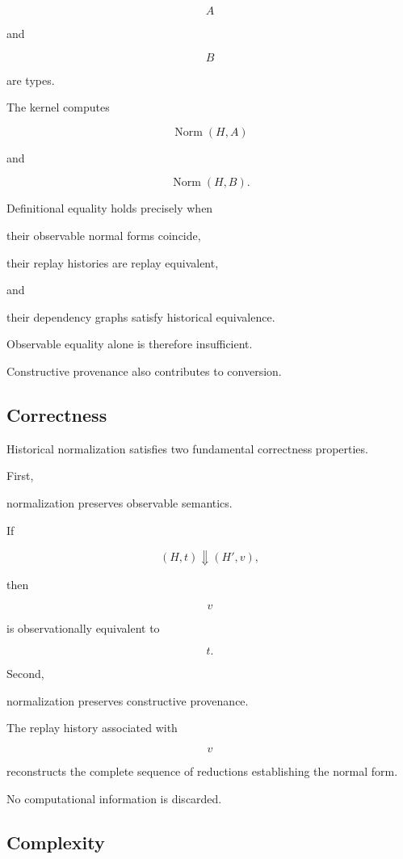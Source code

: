 \documentclass[12pt,oneside]{article}
\theoremstyle{definition}
\theoremstyle{remark}
\begin{document}
\[
A
\]

and

\[
B
\]

are types.

The kernel computes

\[
\operatorname{Norm}(H,A)
\]

and

\[
\operatorname{Norm}(H,B).
\]

Definitional equality holds precisely when

their observable normal forms coincide,

their replay histories are replay equivalent,

and

their dependency graphs satisfy historical equivalence.

Observable equality alone is therefore insufficient.

Constructive provenance also contributes to conversion.


\subsection{Correctness}

Historical normalization satisfies two fundamental correctness properties.

First,

normalization preserves observable semantics.

If

\[
(H,t)
\Downarrow
(H',v),
\]

then

\[
v
\]

is observationally equivalent to

\[
t.
\]

Second,

normalization preserves constructive provenance.

The replay history associated with

\[
v
\]

reconstructs the complete sequence of reductions establishing the normal form.

No computational information is discarded.


\subsection{Complexity}
\end{document}
